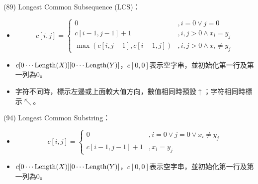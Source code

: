 \item \begin{theorem}{(89)} Longest Common Subsequence (LCS)：\begin{itemize}
        \item \begin{equation}
            c[i, j] = \begin{cases}
                0 &, i = 0 \lor j = 0 \\
                c[i - 1, j - 1] + 1 &, i, j > 0 \land x_i = y_j \\
                \max(c[i, j - 1], c[i - 1, j]) &, i, j > 0 \land x_i \neq y_j
            \end{cases}
        \end{equation}
        \item $c[0 \cdots \operatorname{Length}(X)][0 \cdots \operatorname{Length}(Y)]$，$c[0, 0]$表示空字串，並初始化第一行及第一列為$0$。
        \item 字符不同時，標示左邊或上面較大值方向，數值相同時預設$\uparrow$；字符相同時標示$\nwarrow$。
    \end{itemize}
\end{theorem}

\item \begin{theorem}{(94)} Longest Common Substring：\begin{itemize}
        \item \begin{equation}
            c[i, j] = \begin{cases}
                0 &, i = 0 \lor j = 0 \lor x_i \neq y_j \\
                c[i - 1, j - 1] + 1 &, x_i = y_j
            \end{cases}
        \end{equation}
        \item $c[0 \cdots \operatorname{Length}(X)][0 \cdots \operatorname{Length}(Y)]$，$c[0, 0]$表示空字串，並初始化第一行及第一列為$0$。
    \end{itemize}
\end{theorem}

